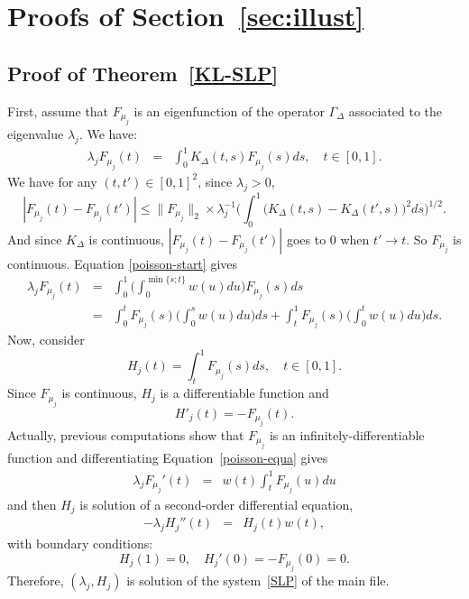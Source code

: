 \documentclass[aos]{imsart}
\theoremstyle{plain}
\theoremstyle{remark}
\newcommand{\1}{1}
\begin{document}
\section{Proofs of Section~\ref{sec:illust}}
\subsection{Proof of Theorem~\ref{KL-SLP}}
First, assume that $F_{\mu_j}$ is an eigenfunction of the operator $\Gamma_\Delta$ associated to the eigenvalue $\lambda_j$. We have: 
\begin{eqnarray}\label{poisson-start}
\lambda_j F_{\mu_j}(t)&=&\int_0^1K_\Delta(t,s)F_{\mu_j}(s)ds,\quad t\in[0,1].
\end{eqnarray}
We have for any $(t,t')\in[0,1]^2$, since $\lambda_j>0$,
$$|F_{\mu_j}(t)-F_{\mu_j}(t')|\leq \|F_{\mu_j}\|_2\times \lambda_j^{-1}\Bigg(\int_0^1\big(K_\Delta(t,s)-K_\Delta(t',s)\big)^2ds\Bigg)^{1/2}.$$
And since $K_\Delta$ is continuous, $|F_{\mu_j}(t)-F_{\mu_j}(t')|$ goes to $0$ when $t'\to t$. So $F_{\mu_j}$ is continuous.
Equation \eqref{poisson-start} gives
\begin{eqnarray}\label{poisson-equa}
\lambda_j F_{\mu_j}(t) &=& \int_0^1\Big(\int_0^{\min\{s;t\}} w(u)du\Big)F_{\mu_j}(s)ds\nonumber\\
&=&\int_0^tF_{\mu_j}(s)\Big(\int_0^s w(u)du\Big)ds+\int_t^1F_{\mu_j}(s)\Big(\int_0^t w(u)du\Big)ds.
\end{eqnarray}
Now, consider
\[
H_j(t)=\int_t^1F_{\mu_j}(s)ds,\quad t\in [0,1].
\]
Since $F_{\mu_j}$ is continuous, $H_j$ is a differentiable function and
\[
H'_j(t)=-F_{\mu_j}(t).
\]
 Actually, previous computations show that $F_{\mu_j}$ is an infinitely-differentiable function and differentiating Equation~\eqref{poisson-equa} gives
\begin{eqnarray} \label{eq:PPKernel}
\lambda_jF_{\mu_j}'(t) &=& w(t)\int_t^1F_{\mu_j}(u)du
\end{eqnarray}
and then $H_j$ is solution of a second-order differential equation, 
\begin{eqnarray}\label{eq:equa_diff-PP}
-\lambda_jH_j''(t) &= &H_j(t) w(t),
\end{eqnarray}
with boundary conditions:
\[
H_j(1)=0,\quad H_j'(0)=-F_{\mu_j}(0)=0.
\]
Therefore, $(\lambda_j,H_j)$ is solution of the system~\eqref{SLP} of the main file.

\bigskip 
\end{document}
